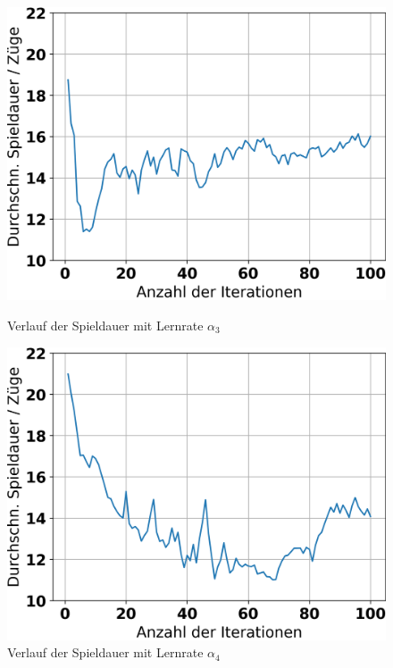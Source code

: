 \begin{figure}[H]
	\begin{minipage}[c]{0.32\linewidth}
		\includegraphics[width=\linewidth]{Bilder/ensemble-training/d_0_00003/graph_game_lengths.png}
		\caption{Verlauf der Spieldauer mit Lernrate $\alpha_3$}
	\end{minipage}
	\hfill
	\begin{minipage}[c]{0.32\linewidth}
		\includegraphics[width=\linewidth]{Bilder/ensemble-training/e_0_00001/graph_game_lengths.png}
		\caption{Verlauf der Spieldauer mit Lernrate $\alpha_4$}
	\end{minipage}
	\hfill
	\begin{minipage}[c]{0.32\linewidth}
		\makebox[\linewidth][r]{}
	\end{minipage}
\end{figure}

